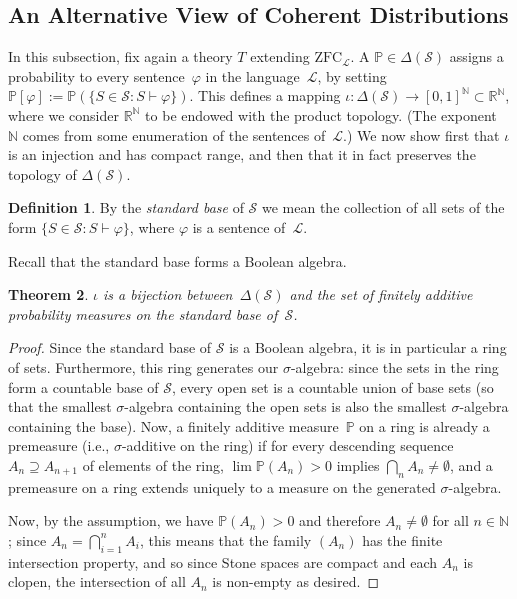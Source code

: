 \documentclass[12pt]{article}
\newcommand{\PP}{\mathbb{P}}
\newcommand{\RR}{\mathbb{R}}
\newcommand{\NN}{\mathbb{N}}
\newcommand{\zfc}{\mathrm{ZFC}}
\newcommand{\zfcl}{{\zfc_\cL}}
\newcommand{\cL}{\mathcal{L}}
\newcommand{\cS}{\mathcal{S}}
\theoremstyle{plain}
\newtheorem{theorem}{Theorem}[subsection]
\theoremstyle{definition}
\newtheorem{definition}[theorem]{Definition}
\theoremstyle{remark}
\begin{document}
\subsection{An Alternative View of Coherent Distributions} \label{An Alternative View of Coherent Distributions}
In this subsection, fix again a theory $T$ extending $\zfcl$.
A $\PP\in\Delta(\cS)$ assigns a probability to every sentence~$\varphi$ in the language~$\cL$, by setting $\PP[\varphi] := \PP(\{S\in\cS:S\vdash\varphi\})$. This defines a mapping $\iota : \Delta(\cS)\to [0,1]^\NN\subset\RR^\NN$, where we consider $\RR^\NN$ to be endowed with the product topology. (The exponent~$\NN$ comes from some enumeration of the sentences of~$\cL$.) We now show first that $\iota$ is an injection and has compact range, and then that it in fact preserves the topology of $\Delta(\cS)$.
\begin{definition}
By the \emph{standard base} of $\cS$ we mean the collection of all sets of the form $\{S\in\cS : S\vdash\varphi\}$, where $\varphi$ is a sentence of~$\cL$.
\end{definition}
Recall that the standard base forms a Boolean algebra.
\begin{theorem}
$\iota$ is a bijection between~$\Delta(\cS)$ and the set of finitely additive probability measures on the standard base of~$\cS$.
\end{theorem}
\begin{proof}
Since the standard base of $\cS$ is a Boolean algebra, it is in particular a ring of sets. Furthermore, this ring generates our $\sigma$-algebra: since the sets in the ring form a countable base of $\cS$, every open set is a countable union of base sets (so that the smallest $\sigma$-algebra containing the open sets is also the smallest $\sigma$-algebra containing the base).
Now, a finitely additive measure~$\PP$ on a ring is already a premeasure (i.e., $\sigma$-additive on the ring) if for every descending sequence $A_n\supseteq A_{n+1}$ of elements of the ring, $\lim \PP(A_n) > 0$ implies $\textstyle\bigcap_n A_n \neq\emptyset$, and a premeasure on a ring extends uniquely to a measure on the generated $\sigma$-algebra. 

Now, by the assumption, we have $\PP(A_n) > 0$ and therefore $A_n\neq\emptyset$ for all $n\in\mathbb{N}$; since $\textstyle A_n = \bigcap_{i=1}^n A_i$, this means that the family $(A_n)$ has the finite intersection property, and so since Stone spaces are compact and each $A_n$ is clopen, the intersection of all $A_n$ is non-empty as desired.
\end{proof}
\end{document}

